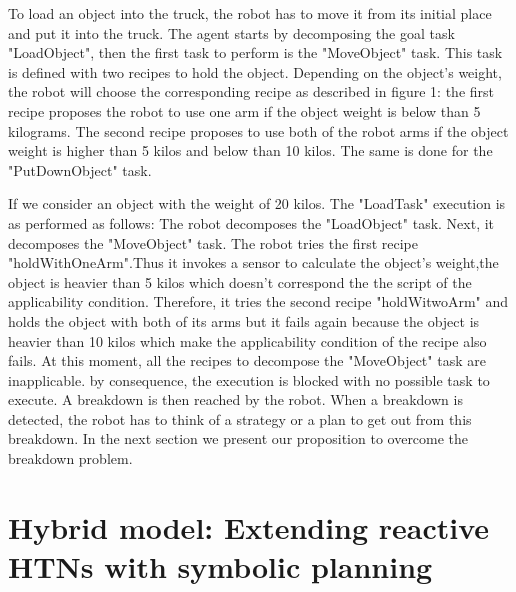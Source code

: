 \documentclass[conference]{IEEEtran}
\begin{document}
	\par To load an object into the truck, the robot has to move it from its initial place and put it into the truck. The agent starts by decomposing the goal task "LoadObject", then the first task to perform is the "MoveObject" task. This task is defined with two recipes to hold the object. Depending on the object's  weight, the robot will choose the corresponding recipe as described in figure 1: the first recipe proposes the robot to use one arm if the object weight is below than 5 kilograms. The second recipe proposes to use both of the robot arms if the object weight is higher than 5 kilos and below than 10 kilos. The same is done for the "PutDownObject" task.
	\par If we consider an object with the weight of 20 kilos. The "LoadTask" execution is as performed as follows: The robot decomposes the "LoadObject" task. Next, it decomposes the "MoveObject" task. The robot tries the first recipe "holdWithOneArm".Thus it invokes a sensor to calculate the object's weight,the object is heavier than 5 kilos which doesn't correspond the the script of the applicability condition. Therefore, it tries the second recipe "holdWitwoArm" and holds the object with both of its arms but it fails again because the object is heavier than 10 kilos which make the applicability condition of the recipe also fails. At this moment, all the recipes to decompose the "MoveObject" task are inapplicable. by consequence, the execution is blocked with no possible task to execute. A breakdown is then reached by the robot. When a breakdown is detected, the robot has to think of a strategy or a plan to get out from this breakdown.  In the next section we present our proposition to overcome the breakdown problem. 
	
	
	
	\section{Hybrid model: Extending reactive HTNs with symbolic planning}
	
\end{document}
